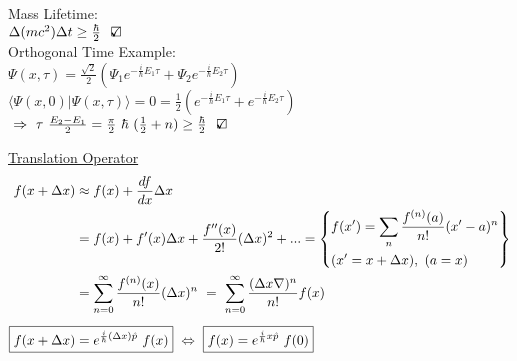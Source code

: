 \documentclass[12pt]{article}
\newcommand{\checkedbox}{\mbox{\ooalign{$\checkmark$\cr\hidewidth$\square$\hidewidth\cr}}} %
\begin{document}
\begin{itemize}
\begin{minipage}[t]{.9\textwidth}
        \indent Mass Lifetime: \\[10pt]
        \indent \indent \( \Delta (mc^2) \Delta t \geq \frac{\hbar}{2} \ \ \checkedbox \) \\[5pt]

        \indent Orthogonal Time Example: \\[10pt]
        \indent \indent \( \Psi(x,\tau) = \frac{\sqrt{2}}{2} 
            ( \Psi_1 e^{-\frac{i}{\hbar} E_1 \tau} 
            + \Psi_2 e^{-\frac{i}{\hbar} E_2 \tau} ) \) \\[10pt]
        \indent \indent \( \Big\langle \Psi(x,0) \big| \Psi(x,\tau) \Big\rangle = 0 
            = \frac{1}{2} ( e^{-\frac{i}{\hbar} E_1 \tau} 
            + e^{-\frac{i}{\hbar} E_2 \tau} ) \) \\[10pt]
        \indent \indent \( \ \Rightarrow \ \tau \ \frac{E_2 - E_1}{2} 
            = \frac{\pi}{2} \ \hbar \ (\frac{1}{2} + n) \geq \frac{\hbar}{2} \ \ \checkedbox \)
    \end{minipage}
\end{itemize}

\newpage \noindent
\underline{Translation Operator}\\[5pt]
\begin{align*}
    f(x + \Delta x) &\approx f(x) + \frac{df}{dx} \Delta x \\
    &= f(x) + f'(x) \Delta x + \frac{f''(x)}{2!} (\Delta x)^2 + ... 
        = \left\{ \begin{aligned}
            &f(x') = \sum_{n} \frac{ f^{(n)}(a) }{n!} (x'-a)^n \\
            &(x' = x + \Delta x), \ (a = x)
        \end{aligned} \right\} \\
    &= \sum_{n=0}^\infty \frac{ f^{(n)}(x) }{n!} (\Delta x)^n 
        \ = \ \sum_{n=0}^\infty \frac{ (\Delta x \nabla)^n }{n!} f(x) \\[5pt]
    \Aboxed{ f(x + \Delta x) &= e^{\frac{i}{\hbar} (\Delta x) \hat{p}} \ f(x) }
    \ \Leftrightarrow \ \boxed{ f(x) = e^{\frac{i}{\hbar} x \hat{p}} \ f(0) }
\end{align*}
\end{document}
